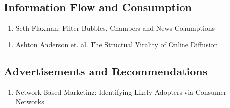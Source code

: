 \subsection{Information Flow and Consumption}
\begin{enumerate}
\item Seth Flaxman. Filter Bubbles, Chambers and News Conumptions
\end{enumerate}
\begin{enumerate}
\item Ashton Anderson et. al. The Structual Virality of Online Diffusion
\end{enumerate}

\subsection{Advertisements and Recommendations}
\begin{enumerate}
\item Network-Based Marketing: Identifying Likely Adopters via Consumer Networks
\end{enumerate}